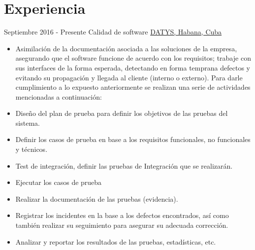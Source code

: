 \documentclass[letterpaper]{twentysecondcv} %
\begin{document}
\makeprofile %
 

\section{Experiencia}

\begin{twenty} %
\twentyitem
    	{Septiembre 2016 -}
		{Presente}
        {Calidad de software}
        {\href{http://datys.cu/}{DATYS, Habana, Cuba}}
        {}
        {
        {\begin{itemize}
        \item Asimilación de la documentación asociada a las soluciones de la empresa, asegurando que el software  funcione de acuerdo con los requisitos; trabaje con sus interfaces de la forma esperada, detectando en forma temprana defectos y evitando su propagación y llegada al cliente (interno o externo). Para darle cumplimiento a lo expuesto anteriormente se realizan una serie de actividades mencionadas a continuación:
\item Diseño del plan de prueba para definir los objetivos de las pruebas del sistema.
\item Definir los casos de prueba en base a los requisitos funcionales, no funcionales y técnicos.
\item Test de integración, definir las pruebas de Integración que se realizarán.
\item Ejecutar los casos de prueba
\item Realizar la documentación de las pruebas (evidencia).
\item Registrar los incidentes en la base a los defectos encontrados, así como también realizar su seguimiento para asegurar su adecuada corrección.
\item Analizar y reportar los resultados de las pruebas, estadísticas, etc. 
        \end{itemize}}
        }
        
\end{twenty}

\end{document}
